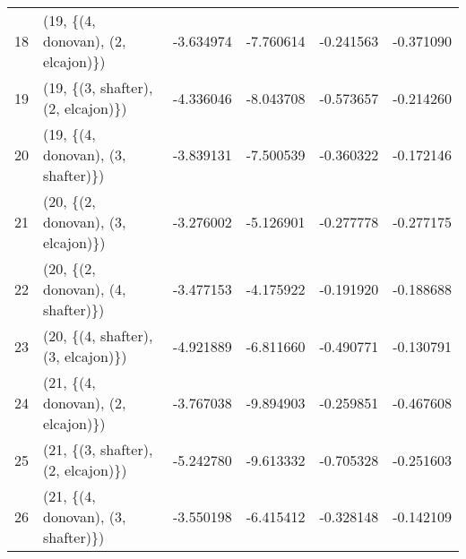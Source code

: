 \begin{tabular}{llrrrr}
18 &  (19, \{(4, donovan), (2, elcajon)\}) & -3.634974 &  -7.760614 &  -0.241563 & -0.371090 \\
19 &  (19, \{(3, shafter), (2, elcajon)\}) & -4.336046 &  -8.043708 &  -0.573657 & -0.214260 \\
20 &  (19, \{(4, donovan), (3, shafter)\}) & -3.839131 &  -7.500539 &  -0.360322 & -0.172146 \\
21 &  (20, \{(2, donovan), (3, elcajon)\}) & -3.276002 &  -5.126901 &  -0.277778 & -0.277175 \\
22 &  (20, \{(2, donovan), (4, shafter)\}) & -3.477153 &  -4.175922 &  -0.191920 & -0.188688 \\
23 &  (20, \{(4, shafter), (3, elcajon)\}) & -4.921889 &  -6.811660 &  -0.490771 & -0.130791 \\
24 &  (21, \{(4, donovan), (2, elcajon)\}) & -3.767038 &  -9.894903 &  -0.259851 & -0.467608 \\
25 &  (21, \{(3, shafter), (2, elcajon)\}) & -5.242780 &  -9.613332 &  -0.705328 & -0.251603 \\
26 &  (21, \{(4, donovan), (3, shafter)\}) & -3.550198 &  -6.415412 &  -0.328148 & -0.142109 \\
\bottomrule
\end{tabular}
